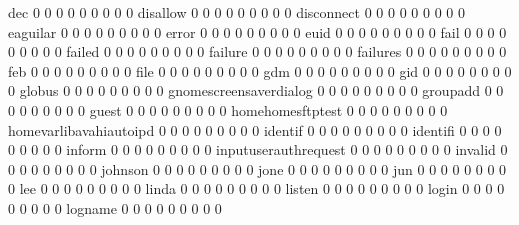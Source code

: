 \documentclass[compress,8pt]{beamer}
\begin{document}
\begin{frame}
\begin{Schunk}
  dec                                        0   0   0   0   0   0   0   0   0
  disallow                                   0   0   0   0   0   0   0   0   0
  disconnect                                 0   0   0   0   0   0   0   0   0
  eaguilar                                   0   0   0   0   0   0   0   0   0
  error                                      0   0   0   0   0   0   0   0   0
  euid                                       0   0   0   0   0   0   0   0   0
  fail                                       0   0   0   0   0   0   0   0   0
  failed                                     0   0   0   0   0   0   0   0   0
  failure                                    0   0   0   0   0   0   0   0   0
  failures                                   0   0   0   0   0   0   0   0   0
  feb                                        0   0   0   0   0   0   0   0   0
  file                                       0   0   0   0   0   0   0   0   0
  gdm                                        0   0   0   0   0   0   0   0   0
  gid                                        0   0   0   0   0   0   0   0   0
  globus                                     0   0   0   0   0   0   0   0   0
  gnomescreensaverdialog                     0   0   0   0   0   0   0   0   0
  groupadd                                   0   0   0   0   0   0   0   0   0
  guest                                      0   0   0   0   0   0   0   0   0
  homehomesftptest                           0   0   0   0   0   0   0   0   0
  homevarlibavahiautoipd                     0   0   0   0   0   0   0   0   0
  identif                                    0   0   0   0   0   0   0   0   0
  identifi                                   0   0   0   0   0   0   0   0   0
  inform                                     0   0   0   0   0   0   0   0   0
  inputuserauthrequest                       0   0   0   0   0   0   0   0   0
  invalid                                    0   0   0   0   0   0   0   0   0
  johnson                                    0   0   0   0   0   0   0   0   0
  jone                                       0   0   0   0   0   0   0   0   0
  jun                                        0   0   0   0   0   0   0   0   0
  lee                                        0   0   0   0   0   0   0   0   0
  linda                                      0   0   0   0   0   0   0   0   0
  listen                                     0   0   0   0   0   0   0   0   0
  login                                      0   0   0   0   0   0   0   0   0
  logname                                    0   0   0   0   0   0   0   0   0

\end{Schunk}
\end{frame}
\end{document}
